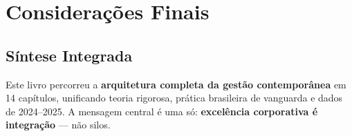 \chapter*{Considerações Finais}

\section*{Síntese Integrada}

Este livro percorreu a \textbf{arquitetura completa da gestão contemporânea} em 14 capítulos, unificando teoria rigorosa, prática brasileira de vanguarda e dados de 2024–2025. A mensagem central é uma só: \textbf{excelência corporativa é integração} — não silos.

